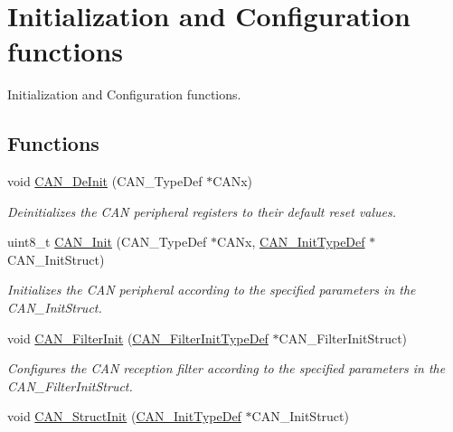 \hypertarget{group___c_a_n___group1}{\section{Initialization and Configuration functions}
\label{group___c_a_n___group1}
}


Initialization and Configuration functions.  


\subsection*{Functions}
\begin{DoxyCompactItemize}
\item 
void \hyperlink{group___c_a_n___group1_ga002b74cd69574a14b17ad445090245cd}{C\-A\-N\-\_\-\-De\-Init} (C\-A\-N\-\_\-\-Type\-Def $\ast$C\-A\-Nx)
\begin{DoxyCompactList}\small\item\em Deinitializes the C\-A\-N peripheral registers to their default reset values. \end{DoxyCompactList}\item 
uint8\-\_\-t \hyperlink{group___c_a_n___group1_ga9023c35a9ab931ad4513fc5d19b4bd6c}{C\-A\-N\-\_\-\-Init} (C\-A\-N\-\_\-\-Type\-Def $\ast$C\-A\-Nx, \hyperlink{struct_c_a_n___init_type_def}{C\-A\-N\-\_\-\-Init\-Type\-Def} $\ast$C\-A\-N\-\_\-\-Init\-Struct)
\begin{DoxyCompactList}\small\item\em Initializes the C\-A\-N peripheral according to the specified parameters in the C\-A\-N\-\_\-\-Init\-Struct. \end{DoxyCompactList}\item 
void \hyperlink{group___c_a_n___group1_ga39476830280340363c51041be6b12647}{C\-A\-N\-\_\-\-Filter\-Init} (\hyperlink{struct_c_a_n___filter_init_type_def}{C\-A\-N\-\_\-\-Filter\-Init\-Type\-Def} $\ast$C\-A\-N\-\_\-\-Filter\-Init\-Struct)
\begin{DoxyCompactList}\small\item\em Configures the C\-A\-N reception filter according to the specified parameters in the C\-A\-N\-\_\-\-Filter\-Init\-Struct. \end{DoxyCompactList}\item 
void \hyperlink{group___c_a_n___group1_gad77ad810868ed111755fc9e8ae0c7646}{C\-A\-N\-\_\-\-Struct\-Init} (\hyperlink{struct_c_a_n___init_type_def}{C\-A\-N\-\_\-\-Init\-Type\-Def} $\ast$C\-A\-N\-\_\-\-Init\-Struct)

\end{DoxyCompactItemize}
